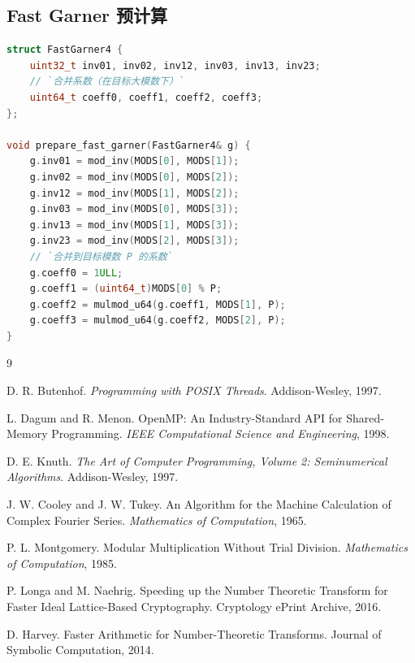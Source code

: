 \documentclass[UTF8,a4paper,10pt]{ctexart}
\begin{document}
\subsection{Fast Garner 预计算}

\begin{lstlisting}[title=Fast Garner 预计算,frame=trbl,language={C++}]
struct FastGarner4 {
    uint32_t inv01, inv02, inv12, inv03, inv13, inv23;
    // `合并系数（在目标大模数下）`
    uint64_t coeff0, coeff1, coeff2, coeff3;
};

void prepare_fast_garner(FastGarner4& g) {
    g.inv01 = mod_inv(MODS[0], MODS[1]);
    g.inv02 = mod_inv(MODS[0], MODS[2]);
    g.inv12 = mod_inv(MODS[1], MODS[2]);
    g.inv03 = mod_inv(MODS[0], MODS[3]);
    g.inv13 = mod_inv(MODS[1], MODS[3]);
    g.inv23 = mod_inv(MODS[2], MODS[3]);
    // `合并到目标模数 P 的系数`
    g.coeff0 = 1ULL;
    g.coeff1 = (uint64_t)MODS[0] % P;
    g.coeff2 = mulmod_u64(g.coeff1, MODS[1], P);
    g.coeff3 = mulmod_u64(g.coeff2, MODS[2], P);
}
\end{lstlisting}

\newpage
\begin{thebibliography}{9}

D. R. Butenhof.
\newblock \emph{Programming with POSIX Threads}.
\newblock Addison-Wesley, 1997.

L. Dagum and R. Menon.
\newblock OpenMP: An Industry-Standard API for Shared-Memory Programming.
\newblock \emph{IEEE Computational Science and Engineering}, 1998.

D. E. Knuth.
\newblock \emph{The Art of Computer Programming, Volume 2: Seminumerical Algorithms}.
\newblock Addison-Wesley, 1997.

J. W. Cooley and J. W. Tukey.
\newblock An Algorithm for the Machine Calculation of Complex Fourier Series.
\newblock \emph{Mathematics of Computation}, 1965.

P. L. Montgomery.
\newblock Modular Multiplication Without Trial Division.
\newblock \emph{Mathematics of Computation}, 1985.

P. Longa and M. Naehrig.
\newblock Speeding up the Number Theoretic Transform for Faster Ideal Lattice-Based Cryptography.
\newblock Cryptology ePrint Archive, 2016.

D. Harvey.
\newblock Faster Arithmetic for Number-Theoretic Transforms.
\newblock Journal of Symbolic Computation, 2014.

\end{thebibliography}
\end{document}
